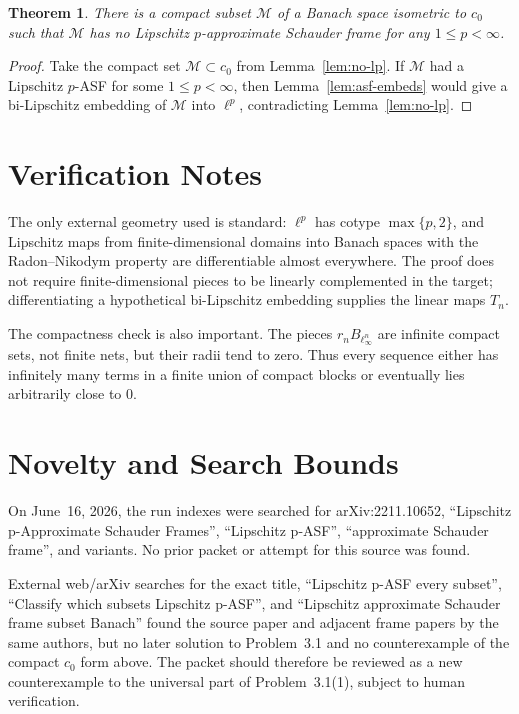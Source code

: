 \documentclass[11pt]{article}
\newtheorem{theorem}{Theorem}
\newcommand{\M}{\mathcal M}
\begin{document}
\begin{theorem}
There is a compact subset \(\M\) of a Banach space isometric to \(c_0\) such
that \(\M\) has no Lipschitz \(p\)-approximate Schauder frame for any
\(1\leq p<\infty\).
\end{theorem}

\begin{proof}
Take the compact set \(\M\subset c_0\) from Lemma~\ref{lem:no-lp}. If \(\M\)
had a Lipschitz \(p\)-ASF for some \(1\leq p<\infty\), then
Lemma~\ref{lem:asf-embeds} would give a bi-Lipschitz embedding of \(\M\) into
\(\ell^p\), contradicting Lemma~\ref{lem:no-lp}.
\end{proof}

\section*{Verification Notes}

The only external geometry used is standard: \(\ell^p\) has cotype
\(\max\{p,2\}\), and Lipschitz maps from finite-dimensional domains into
Banach spaces with the Radon--Nikodym property are differentiable almost
everywhere. The proof does not require finite-dimensional pieces to be
linearly complemented in the target; differentiating a hypothetical
bi-Lipschitz embedding supplies the linear maps \(T_n\).

The compactness check is also important. The pieces \(r_nB_{\ell_\infty^n}\)
are infinite compact sets, not finite nets, but their radii tend to zero.
Thus every sequence either has infinitely many terms in a finite union of
compact blocks or eventually lies arbitrarily close to \(0\).

\section*{Novelty and Search Bounds}

On June~16, 2026, the run indexes were searched for arXiv:2211.10652,
``Lipschitz p-Approximate Schauder Frames'', ``Lipschitz p-ASF'',
``approximate Schauder frame'', and variants. No prior packet or attempt for
this source was found.

External web/arXiv searches for the exact title, ``Lipschitz p-ASF every
subset'', ``Classify which subsets Lipschitz p-ASF'', and ``Lipschitz
approximate Schauder frame subset Banach'' found the source paper and adjacent
frame papers by the same authors, but no later solution to Problem~3.1 and no
counterexample of the compact \(c_0\) form above. The packet should therefore
be reviewed as a new counterexample to the universal part of Problem~3.1(1),
subject to human verification.
\end{document}
